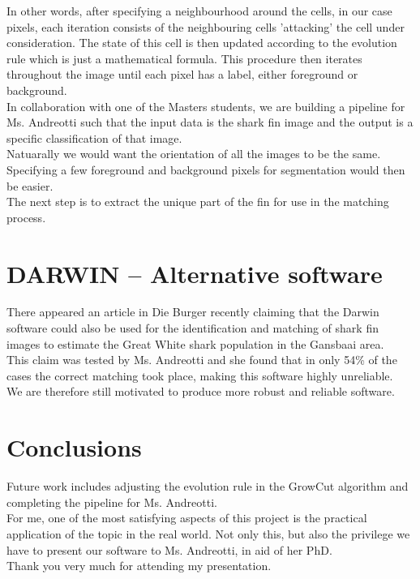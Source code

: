 \documentclass[a4paper,10pt]{article}
\begin{document}
In other words, after specifying a neighbourhood around the cells, in our case
pixels, each iteration consists of
the neighbouring cells 'attacking' the cell under consideration.  The state of
this cell is then updated
according to the evolution rule which is just a mathematical formula. This procedure then iterates throughout the
image until each pixel has a label, either foreground or background. \\

In collaboration with one of the Masters
students, we are building a pipeline for Ms. Andreotti
such that the input data is the shark fin image and the output is a specific
classification of that image.\\

Natuarally we would want the orientation of all the images to be the same.\\

Specifying a few foreground and background pixels for segmentation would then be easier. \\

The 
next step is to extract the unique part of the fin for use in the matching process.



\section{DARWIN -- Alternative software}
There appeared an article in Die Burger recently claiming
that the Darwin software could also be used for the identification and matching of
shark fin images to estimate the Great White shark population in the Gansbaai
area.  \\

This claim was tested by Ms. Andreotti and she found that in only
54\% of the cases the correct matching took place, making this software highly
unreliable. \\

We are therefore still motivated to produce more robust and reliable software. 

\section{Conclusions}
Future work includes adjusting the evolution rule in the GrowCut algorithm
and completing the pipeline for Ms. Andreotti.\\

For me, one of the most satisfying aspects of this project is the practical
application of the topic in the real world.  Not only this, but also the
privilege we have to present our software to Ms. Andreotti, in aid of
her PhD.   \\

Thank you very much for attending my presentation.
\end{document}
